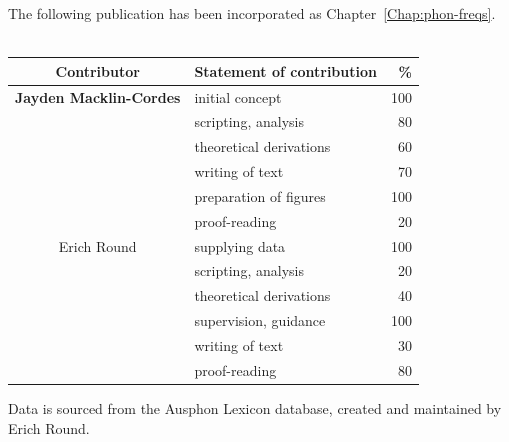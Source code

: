 \cleartoevenpage
\pagestyle{empty}	

\noindent
The following publication has been incorporated as Chapter~\ref{Chap:phon-freqs}.\\

\noindent
{}\\

\begin{table}[h]
	\centering
	\begin{tabular}{clr}
		\toprule
		Contributor & Statement of contribution & \% \\
		\midrule
		\textbf{Jayden Macklin-Cordes}	& initial concept			& 100 \\
		                                & scripting, analysis     	& 80  \\
		                                & theoretical derivations 	& 60  \\
		                                & writing of text 			& 70  \\
		                                & preparation of figures 	& 100 \\
										& proof-reading				& 20  \\
		\midrule
		Erich Round						& supplying data            & 100 \\
		                                & scripting, analysis       & 20  \\
		                                & theoretical derivations 	& 40  \\
		                                & supervision, guidance 	& 100 \\
		                                & writing of text 			& 30  \\
										& proof-reading				& 80  \\
		\bottomrule
	\end{tabular}
\end{table}

\noindent
Data is sourced from the Ausphon Lexicon database, created and maintained by Erich Round.\\

